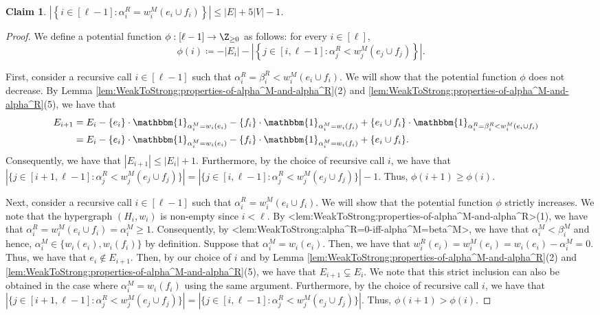 \documentclass{article}
\def\Cref#1{<#1>}%
\newtheorem{claim}{Claim}[section]
\newcommand{\indicator}{\ensuremath{\mathbbm{1}}\xspace}
\newcommand{\kristof}[1]{{\color{purple}[{\tiny Kristof: \bf #1}]\marginpar{\color{red}*}}}
\begin{document}
\begin{claim}\label{claim:WeakToStrong:hyperedge-support-size:alpha^R<weight-of-added-hyperedge}
    $\left|\left\{i \in [\ell - 1] : \alpha_i^R = w_i^M(e_i \cup f_i)\right\}\right| \leq |E| + 5|V| - 1$. %
\end{claim}
\begin{proof}
    We define a potential function $\phi:[\ell - 1] \rightarrow \Z_{\geq 0}$ as follows: for every $i \in [\ell]$,
    $$\phi(i) \coloneqq  -|E_i| - \left|\left\{j \in [i,\ell - 1] : \alpha_j^R < w_j^M(e_j\cup f_j)\right\}\right|.$$
    
    First, consider a recursive call $i \in [\ell - 1]$ such that $\alpha_i^R = \beta_i^R < w_i^M(e_i \cup f_i)$. We will show that the potential function $\phi$ does not decrease. By Lemma \ref{lem:WeakToStrong:properties-of-alpha^M-and-alpha^R}(2) and \ref{lem:WeakToStrong:properties-of-alpha^M-and-alpha^R}(5), we have that 
    \begin{align*}
       E_{i+1} & = E_i - \{e_i\}\cdot \indicator_{\alpha_i^M = w_i(e_i)} - \{f_i\}\cdot \indicator_{\alpha_i^M = w_i(f_i)} + \{e_i\cup f_i\}\cdot \indicator_{\alpha_i^R = \beta_i^R < w_i^M(e_i \cup f_i)}&\\
        &= E_i - \{e_i\}\cdot \indicator_{\alpha_i^M = w_i(e_i)} - \{f_i\}\cdot \indicator_{\alpha_i^M = w_i(f_i)} + \{e_i\cup f_i\}.&
    \end{align*}
Consequently, 
    we have that $|E_{i+1}| \leq |E_i| + 1$. Furthermore, by the choice of recursive call $i$, we have that $\left|\{j \in [i+1, \ell - 1] : \alpha_j^R < w_j^M(e_j\cup f_j)\}\right| = \left|\{j \in [i, \ell - 1] : \alpha_j^R < w_j^M(e_j\cup f_j)\}\right| - 1$. Thus, $\phi(i+1) \geq \phi(i)$.
    
     Next, consider a recursive call $i \in [\ell - 1]$ such that $\alpha_i^R = w_i^M(e_i \cup f_i)$. We will show that the potential function $\phi$ strictly increases. We note that the hypergraph $(H_i, w_i)$ is non-empty since $i < \ell$.  
     By \Cref{lem:WeakToStrong:properties-of-alpha^M-and-alpha^R}(1), we have that $\alpha_i^R = w_i^M(e_i \cup f_i) = \alpha_i^M \geq 1$. 
     Consequently, by  \Cref{lem:WeakToStrong:alpha^R=0-iff-alpha^M=beta^M}, we have that $\alpha_i^M  < \beta_i^M$ and hence, $\alpha_i^M \in \{w_i(e_i), w_i(f_i)\}$ by definition. 
     Suppose that $\alpha_i^M = w_i(e_i)$. 
     Then, we have that $w^R_i(e_i) = w^M_i(e_i) = w_i(e_i) - \alpha_{i}^M = 0$. 
     Thus, we have that $e_i \not \in E_{i+1}$. 
     Then, by our choice of $i$ and by Lemma \ref{lem:WeakToStrong:properties-of-alpha^M-and-alpha^R}(2) and \ref{lem:WeakToStrong:properties-of-alpha^M-and-alpha^R}(5), we have that $E_{i+1} \subsetneq E_i$. 
     We note that this strict inclusion can also be obtained in the case where $\alpha_i^M = w_i(f_i)$ using the same argument. Furthermore, by the choice of recursive call $i$, we have that $\left|\{j \in [i+1, \ell - 1] : \alpha_j^R < w_j^M(e_j\cup f_j)\}\right| = \left|\{j \in [i, \ell - 1] : \alpha_j^R < w_j^M(e_j\cup f_j)\}\right|$.
     Thus, $\phi(i+1) > \phi(i)$.


\end{proof}
\end{document}
